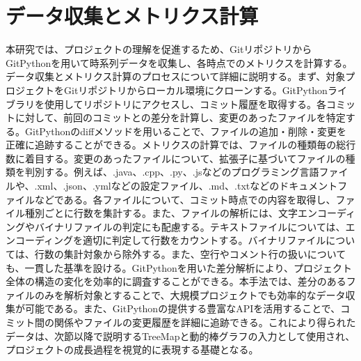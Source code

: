 \documentclass[12pt,twoside]{jbook}
\begin{document}
\section{データ収集とメトリクス計算}
本研究では、プロジェクトの理解を促進するため、GitリポジトリからGitPythonを用いて時系列データを収集し、各時点でのメトリクスを計算する。データ収集とメトリクス計算のプロセスについて詳細に説明する。まず、対象プロジェクトをGitリポジトリからローカル環境にクローンする。GitPythonライブラリを使用してリポジトリにアクセスし、コミット履歴を取得する。各コミットに対して、前回のコミットとの差分を計算し、変更のあったファイルを特定する。GitPythonのdiffメソッドを用いることで、ファイルの追加・削除・変更を正確に追跡することができる。メトリクスの計算では、ファイルの種類毎の総行数に着目する。変更のあったファイルについて、拡張子に基づいてファイルの種類を判別する。例えば、.java、.cpp、.py、.jsなどのプログラミング言語ファイルや、.xml、.json、.ymlなどの設定ファイル、.md、.txtなどのドキュメントファイルなどである。各ファイルについて、コミット時点での内容を取得し、ファイル種別ごとに行数を集計する。また、ファイルの解析には、文字エンコーディングやバイナリファイルの判定にも配慮する。テキストファイルについては、エンコーディングを適切に判定して行数をカウントする。バイナリファイルについては、行数の集計対象から除外する。また、空行やコメント行の扱いについても、一貫した基準を設ける。GitPythonを用いた差分解析により、プロジェクト全体の構造の変化を効率的に調査することができる。本手法では、差分のあるファイルのみを解析対象とすることで、大規模プロジェクトでも効率的なデータ収集が可能である。また、GitPythonの提供する豊富なAPIを活用することで、コミット間の関係やファイルの変更履歴を詳細に追跡できる。これにより得られたデータは、次節以降で説明するTreeMapと動的棒グラフの入力として使用され、プロジェクトの成長過程を視覚的に表現する基礎となる。
\end{document}
